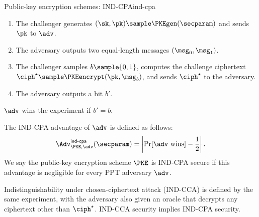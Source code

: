 \begin{experimentbox}{Public-key encryption schemes: IND-CPA}{ind-cpa}

  \begin{enumerate}

    \item The challenger generates $(\sk, \pk) \sample \PKEgen(\secparam)$ and
sends $\pk$ to $\adv$.

    \item The adversary outputs two equal-length messages $(\msg_0,\msg_1)$.

    \item The challenger samples $b \sample \{0,1\}$, computes the challenge
ciphertext $\ciph^\star \sample \PKEencrypt(\pk,\msg_b)$, and sends
$\ciph^\star$ to the adversary.

    \item The adversary outputs a bit $b'$.

  \end{enumerate}

  $\adv$ wins the experiment if $b' = b$.

\end{experimentbox}

The IND-CPA advantage of $\adv$ is defined as follows:
%
\begin{equation*}
%
  \Adv^{\mathsf{ind\text{-}cpa}}_{\PKE, \adv}(\secparam) = \left|
\Pr[\adv\text{ wins}] - \frac{1}{2} \right|.
%
\end{equation*}
%
We say the public-key encryption scheme $\PKE$ is IND-CPA secure if this
advantage is negligible for every PPT adversary $\adv$.

Indistinguishability under chosen-ciphertext attack (IND-CCA) is defined by the
same experiment, with the adversary also given an oracle that decrypts any
ciphertext other than $\ciph^\star$. IND-CCA security implies IND-CPA security.
